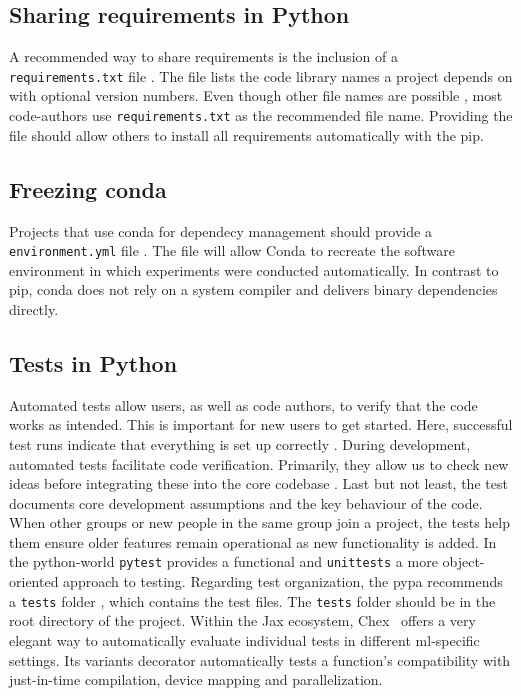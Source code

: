 \subsection{Sharing requirements in Python}
A recommended way to share requirements is the inclusion of a \texttt{requirements.txt} file 
\cite{pip2025docs,NeuripsCodeguide}. The file lists the code library names a project depends on
with optional version numbers. Even though other file names are possible
\cite{pip2025docs}, most code-authors use \texttt{requirements.txt} as the recommended file name. Providing the file should allow others to install all requirements automatically with the \ac{pip}.

\subsection{Freezing conda}
Projects that use conda \cite{conda2025repo} for dependecy management should
provide a \texttt{environment.yml} file \cite{NeuripsCodeguide}.
The file will allow Conda to recreate the software environment in which experiments were conducted automatically. In contrast to \ac{pip}, conda does not rely on a system compiler and delivers binary dependencies directly.

\subsection{Tests in Python}
Automated tests allow users, as well as code authors, to verify that the code works as intended.
This is important for new users to get started. Here, successful test runs indicate that everything is set up correctly \cite{Lost2017TenUsable}.
During development, automated tests facilitate code verification. Primarily, they allow us
to check new ideas before integrating these into the core codebase \cite{Yasset2016TenGit}.
Last but not least, the test documents core development assumptions and the key behaviour of the code.
When other groups or new people in the same group join a project, the tests help them ensure older features remain operational as new functionality is added. 
In the python-world \texttt{pytest} \cite{pytest2025docs} provides a functional and
\texttt{unittests} \cite{unittest2025pythondocs} a more object-oriented approach to testing.
Regarding test organization, the \ac{pypa} recommends a \texttt{tests} folder \cite{packaging2025python},
which contains the test files. The \texttt{tests} folder should be in the root directory of the project.
Within the Jax ecosystem, Chex~\cite{chex2025docs} offers a very elegant way to automatically evaluate individual tests in different \ac{ml}-specific settings.
Its variants decorator automatically tests a function's compatibility with just-in-time compilation, device mapping and parallelization.

